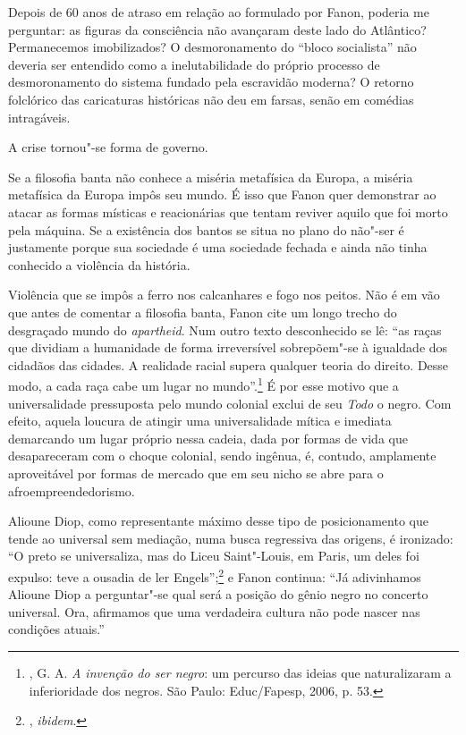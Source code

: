 Depois de 60 anos de atraso em
relação ao formulado por Fanon, poderia me perguntar: as figuras da
consciência não avançaram deste
lado do Atlântico? Permanecemos imobilizados? O desmoronamento do
``bloco socialista'' não deveria ser entendido como a inelutabilidade do
próprio processo de desmoronamento do sistema fundado pela escravidão
moderna? O retorno folclórico das caricaturas históricas não deu em
farsas, senão em comédias intragáveis.

A crise tornou"-se forma de governo.

Se a filosofia banta não conhece a miséria metafísica da Europa, a
miséria metafísica da Europa impôs seu mundo. É isso que Fanon quer
demonstrar ao atacar as formas místicas e reacionárias que tentam
reviver aquilo que foi morto pela máquina. Se a existência dos bantos se
situa no plano do não"-ser é justamente porque sua sociedade é uma
sociedade fechada e ainda não tinha conhecido a violência da história.

Violência que se impôs a ferro nos calcanhares e fogo nos peitos. Não é
em vão que antes de comentar a filosofia banta, Fanon cite um longo
trecho do desgraçado mundo do \emph{apartheid}. Num outro texto
desconhecido se lê: ``as raças que dividiam a humanidade de forma
irreversível sobrepõem"-se à igualdade dos cidadãos das cidades. A
realidade racial supera qualquer teoria do direito. Desse modo, a cada
raça cabe um lugar no mundo''.\footnote{,
  G. A. \emph{A invenção do ser negro}: um percurso das ideias que
  naturalizaram a inferioridade dos negros. São Paulo: Educ/Fapesp,
  2006, p. 53.} É por esse motivo que a universalidade pressuposta pelo
mundo colonial exclui de seu \emph{Todo} o negro. Com efeito, aquela
loucura de atingir uma universalidade mítica e imediata demarcando um
lugar próprio nessa cadeia, dada por formas de vida que desapareceram
com o choque colonial, sendo ingênua, é, contudo, amplamente
aproveitável por formas de mercado que em seu nicho se abre para o
afroempreendedorismo.

Alioune Diop, como representante
máximo desse tipo de posicionamento que tende ao universal sem mediação,
numa busca regressiva das origens, é ironizado: ``O preto se
universaliza, mas do Liceu Saint"-Louis, em Paris, um deles foi expulso:
teve a ousadia de ler Engels'';\footnote{, \emph{ibidem}.} e Fanon
continua: ``Já adivinhamos Alioune Diop a perguntar"-se qual será a
posição do gênio negro no concerto universal. Ora, afirmamos que uma
verdadeira cultura não pode nascer nas condições atuais.''

